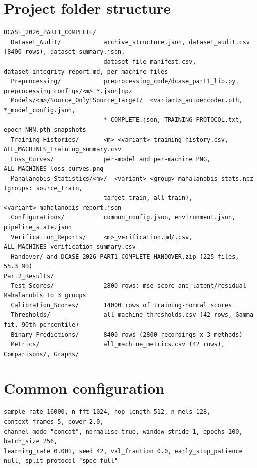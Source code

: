 \section{Project folder structure}\label{app:folders}
\begin{lstlisting}
DCASE_2026_PART1_COMPLETE/
  Dataset_Audit/            archive_structure.json, dataset_audit.csv (8400 rows), dataset_summary.json,
                            dataset_file_manifest.csv, dataset_integrity_report.md, per-machine files
  Preprocessing/            preprocessing_code/dcase_part1_lib.py, preprocessing_configs/<m>_*.json|npz
  Models/<m>/Source_Only|Source_Target/  <variant>_autoencoder.pth, *_model_config.json,
                            *_COMPLETE.json, TRAINING_PROTOCOL.txt, epoch_NNN.pth snapshots
  Training_Histories/       <m>_<variant>_training_history.csv, ALL_MACHINES_training_summary.csv
  Loss_Curves/              per-model and per-machine PNG, ALL_MACHINES_loss_curves.png
  Mahalanobis_Statistics/<m>/  <variant>_<group>_mahalanobis_stats.npz (groups: source_train,
                            target_train, all_train), <variant>_mahalanobis_report.json
  Configurations/           common_config.json, environment.json, pipeline_state.json
  Verification_Reports/     <m>_verification.md/.csv, ALL_MACHINES_verification_summary.csv
  Handover/ and DCASE_2026_PART1_COMPLETE_HANDOVER.zip (225 files, 55.3 MB)
Part2_Results/
  Test_Scores/              2800 rows: mse_score and latent/residual Mahalanobis to 3 groups
  Calibration_Scores/       14000 rows of training-normal scores
  Thresholds/               all_machine_thresholds.csv (42 rows, Gamma fit, 90th percentile)
  Binary_Predictions/       8400 rows (2800 recordings x 3 methods)
  Metrics/                  all_machine_metrics.csv (42 rows), Comparisons/, Graphs/
\end{lstlisting}

\section{Common configuration}
\begin{lstlisting}
sample_rate 16000, n_fft 1024, hop_length 512, n_mels 128, context_frames 5, power 2.0,
channel_mode "concat", normalise true, window_stride 1, epochs 100, batch_size 256,
learning_rate 0.001, seed 42, val_fraction 0.0, early_stop_patience null, split_protocol "spec_full"
\end{lstlisting}

